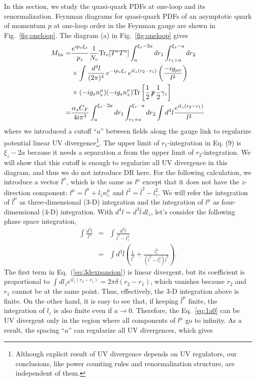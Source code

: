 \documentclass[twocolumn,aps,prd,superscriptaddress,nofootinbib,showpacs]{revtex4}
\begin{document}
In this section, we study the quasi-quark PDFs at one-loop and its renormalization. Feynman diagrams for quasi-quark PDFs of an asymptotic quark of momentum $p$ at one-loop order in the Feynman gauge are shown in Fig.~\ref{fig:oneloop}.  The diagram (a) in Fig.~\ref{fig:oneloop} gives
\begin{align}
\begin{split}\label{eq:1a0}
M_{1a}=&\frac{e^{i p_z \xi_z}}{p_z}\frac{1}{N_c} \text{Tr}_c[T^aT^a] \int_a^{\xi_z-2a}dr_1\int_{r_1+a}^{\xi_z-a}dr_2\\
&\times \int \frac{d^4l}{(2\pi)^4} \,e^{-i p_z \xi_z} \,e^{il_z(r_2-r_1)} \left(\frac{-ig_{\mu\nu}}{l^2}\right) \\
&\times (-ig_s n_z^\mu)(-ig_s n_z^\nu)  \text{Tr}\left[\frac{1}{2}\, \slashed{p}\, \frac{1}{2}\gamma_z\right]   \\
=& \frac{\alpha_s C_F}{4 i \pi^3} \int_a^{\xi_z-2a}dr_1\int_{r_1+a}^{\xi_z-a}dr_2 \int d^4l\frac{e^{il_z(r_2-r_1)}}{l^2}
\end{split}
\end{align}
where we introduced a cutoff ``$a$'' between fields along the gauge link to regularize potential linear UV divergence\footnote{Although explicit result of UV divergence depends on UV regulators, our conclusions, like power counting rules and renormalization structure, are independent of them.}. The upper limit of $r_1$-integration in Eq. (9) is $\xi_z-2a$ because it needs a separation $a$ from the upper limit of $r_2$-integration.  We will show that this cutoff is enough to regularize all UV divergence in this diagram, and thus we do not introduce DR here. For the following calculation, we introduce a vector $\bar{l}^\mu$, which is the same as $l^\mu$ except that it does not have the $z$-direction component: $l^\mu = \bar{l}^\mu + l_z n_z^\mu$ and $l^2=\bar{l}^2-l_z^2$. We will refer the integration of $\bar{l}^\mu$ as three-dimensional (3-D) integration and the integration of $l^\mu$ as four-dimensional (4-D) integration.  With $d^4l = d^{3}\bar{l}\, dl_z$, let's consider the following phase space integration,
\begin{eqnarray}\label{eq:3dexpansion}
\int \frac{d^{3}\bar{l}}{l^2} &=&
\int \frac{d^{3}\bar{l}}{\bar{l}^2-l_z^2}
\nonumber\\
&=& \int d^{3}\bar{l} \left( \frac{1}{\bar{l}^2}+ \frac{l_z^2}{(\bar{l}^2-l_z^2)\bar{l}^2}\right).
\end{eqnarray}
The first term in Eq.~(\ref{eq:3dexpansion}) is linear divergent, but its coefficient is proportional to $\int dl_z e^{il_z(r_2-r_1)} = 2\pi \delta(r_2-r_1)$, which vanishes because $r_2$ and $r_1$ cannot be at the same point. Thus, effectively, the 3-D integration above is finite. On the other hand, it is easy to see that, if keeping $\bar{l}^\mu$ finite, the integration of $l_z$ is also finite even if $a\to 0$. Therefore, the Eq.~\eqref{eq:1a0} can be UV divergent only in the region where all components of $l^\mu$ go to infinity. As a result, the spacing ``$a$'' can regularize all UV divergences, which gives
\end{document}
